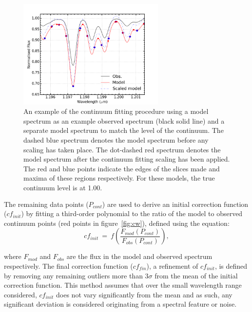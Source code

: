 \begin{figure}
 \centering
\includegraphics[width=0.65\textwidth]{JAnal/cftaction}
\caption[An Example of continuum fitting procedure on individual diagnostic lines]{
An example of the continuum fitting procedure using a model spectrum as an example observed spectrum (black solid line) and a separate model spectrum to match the level of the continuum.
The dashed blue spectrum denotes the model spectrum before any scaling has taken place.
The dot-dashed red spectrum denotes the model spectrum after the continuum fitting scaling has been applied.
The red and blue points indicate the edges of the slices made and maxima of these regions respectively.
For these models, the true continuum level is at 1.00.\label{fig:cftaction}
         }
\end{figure}

The remaining data points ($P_{cont}$) are used to derive an initial correction function
($cf_{init}$) by fitting a third-order polynomial to the ratio of the model to observed continuum points (red points in figure~\ref{fig:cw}), defined using the equation:
\begin{equation}
    cf_{init}~=~f\left(\frac{F_{mod}(P_{cont})}{F_{obs}(P_{cont})}\right),
    \label{eq:cf_init}
\end{equation}

\noindent where $F_{mod}$ and $F_{obs}$ are the flux in the model and observed spectrum respectively.
The final correction function ($cf_{fin}$), a refinement of $cf_{init}$,
is defined by removing any remaining outliers more than 3$\sigma$ from the mean of the initial correction function.
This method assumes that over the small wavelength range considered,
$cf_{init}$ does not vary significantly from the mean and as such, any significant deviation is considered originating from a spectral feature or noise.

